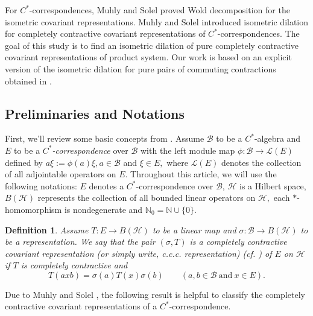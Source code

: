 \documentclass[12pt]{amsart}
\numberwithin{equation}{section}
\theoremstyle{plain}
\newtheorem{definition}[theorem]{Definition}
\begin{document}
	For $C^*$-correspondences, Muhly and Solel \cite{MS99} proved Wold decomposition for the isometric covariant representations. Muhly and Solel \cite{MS98} introduced isometric dilation for completely contractive covariant representations of $C^*$-correspondences. The goal of this study is to find an isometric dilation of pure completely contractive covariant representations of product system. Our work is based on an explicit version of the isometric dilation for pure pairs of commuting contractions obtained in \cite{DSS17, S21}.
	
	
	
	
	
	\subsection{Preliminaries and Notations}
	First, we'll review some basic concepts from \cite{L95, MS98, MS99}.	
	Assume $\mathcal{B}$ to be a $C^*$-algebra and $E$ to be a {\it $C^*$-correspondence} over $\mathcal{B}$ with the left module map $\phi:\mathcal B\to \mathcal L(E)$ defined by $ a\xi:=\phi(a)\xi, a\in\mathcal{B}$ and $\xi\in E,$ where $\mathcal L(E)$ denotes the collection of all adjointable operators on $E.$ Throughout this article, we will use the following notations: $E$ denotes a $C^*$-correspondence over $\mathcal{B}$, $\mathcal{H}$ is a Hilbert space, $B(\mathcal{H})$ represents the collection of all bounded linear operators on $\mathcal{H},$  each $*$-homomorphism is nondegenerate and $\mathbb N_0 =\mathbb N\cup\{0\}.$
	
	\begin{definition}
		Assume $T:E\to B(\mathcal H)$ to be a linear map and  $\sigma:\mathcal{B}\to B(\mathcal H)$ to be a representation. We say that the pair $(\sigma,T)$ is a {\rm completely contractive covariant representation} (or simply write, {\rm c.c.c. representation}) (cf. \cite{MS98}) of $E$ on $\mathcal H$  if $T$ is completely contractive and
		\[
		T(ax b)=\sigma(a)T(x)\sigma(b) \quad \quad (
		a,b\in\mathcal{B}~ \mbox{and}~ x\in E).
		\] 
	
	\end{definition}
	
	 Due to Muhly and Solel \cite{MS98}, the following result is helpful to classify the completely contractive covariant representations of a $C^*$-correspondence.
	
\end{document}
